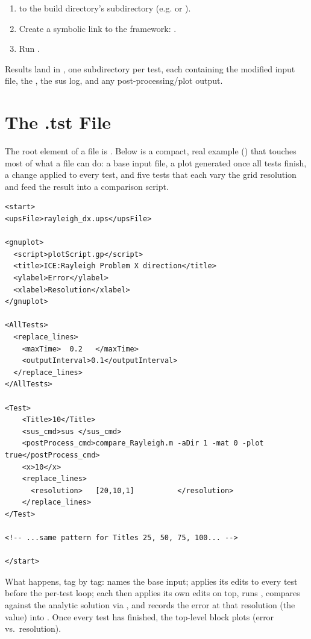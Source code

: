 \begin{enumerate}
\item {} to the build directory's  subdirectory (e.g.  or
  ).
\item Create a symbolic link to the framework: .
\item Run .
\end{enumerate}

Results land in , one subdirectory per
test, each containing the modified input file, the , the sus log, and any
post-processing/plot output.

\section{The .tst File}
\label{Sec:PS-TstFile}

The root element of a  file is . Below is a compact, real example
() that touches most of what a  file can do: a base input file, a
plot generated once all tests finish, a change applied to every test, and five tests that each vary
the grid resolution and feed the result into a comparison script.

{\footnotesize
\begin{verbatim}
<start>
<upsFile>rayleigh_dx.ups</upsFile>

<gnuplot>
  <script>plotScript.gp</script>
  <title>ICE:Rayleigh Problem X direction</title>
  <ylabel>Error</ylabel>
  <xlabel>Resolution</xlabel>
</gnuplot>

<AllTests>
  <replace_lines>
    <maxTime>  0.2   </maxTime>
    <outputInterval>0.1</outputInterval>
  </replace_lines>
</AllTests>

<Test>
    <Title>10</Title>
    <sus_cmd>sus </sus_cmd>
    <postProcess_cmd>compare_Rayleigh.m -aDir 1 -mat 0 -plot true</postProcess_cmd>
    <x>10</x>
    <replace_lines>
      <resolution>   [20,10,1]          </resolution>
    </replace_lines>
</Test>

<!-- ...same pattern for Titles 25, 50, 75, 100... -->

</start>
\end{verbatim}
}

What happens, tag by tag:  names the base input;  applies its edits
to every test before the per-test loop; each  then applies its own edits on top, runs
, compares against the analytic solution via , and records the
error at that resolution (the  value) into . Once every test has finished,
the top-level  block plots  (error vs.\ resolution).

